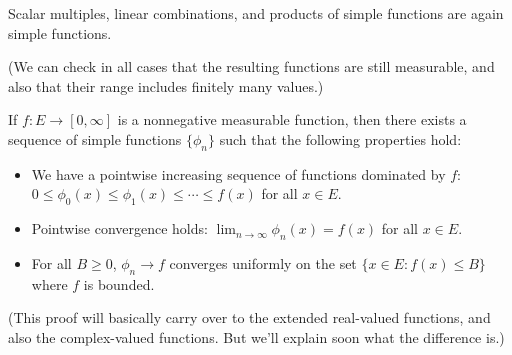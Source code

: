 \begin{proposition}
Scalar multiples, linear combinations, and products of simple functions are again simple functions.
\end{proposition}

(We can check in all cases that the resulting functions are still measurable, and also that their range includes finitely many values.)

\begin{theorem}\label{meassimpleapprox}
If $f: E \to [0, \infty]$ is a nonnegative measurable function, then there exists a sequence of simple functions $\{\phi_n\}$ such that the following properties hold:
\begin{itemize}
\item[(a)] We have a pointwise increasing sequence of functions dominated by $f$: $0 \le \phi_0(x) \le \phi_1(x) \le \cdots \le f(x)$ for all $x \in E$.
\item[(b)] Pointwise convergence holds: $\lim_{n \to \infty} \phi_n(x) = f(x)$ for all $x \in E$.
\item[(c)] For all $B \ge 0$, $\phi_n \to f$ converges uniformly on the set $\{x \in E: f(x) \le B\}$ where $f$ is bounded.
\end{itemize}
\end{theorem}

(This proof will basically carry over to the extended real-valued functions, and also the complex-valued functions. But we'll explain soon what the difference is.)

